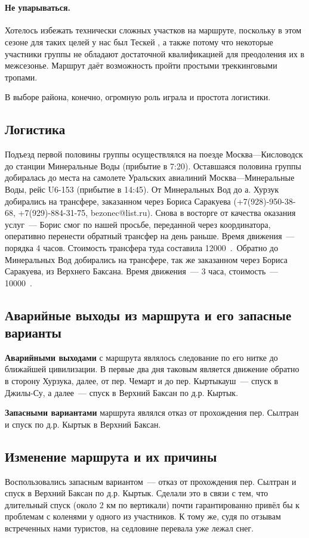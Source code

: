 ﻿﻿\paragraph{﻿﻿Не упарываться.} Хотелось избежать технически сложных участков на маршруте, поскольку в этом сезоне для таких целей у нас был Тескей \cite{teskei2025ostapiv}, а также потому что некоторые участники группы не обладают достаточной квалификацией для преодоления их в межсезонье. Маршрут даёт возможность пройти простыми треккинговыми тропами.

В выборе района, конечно, огромную роль играла и простота логистики.

\subsection{Логистика}
Подъезд первой половины группы осуществлялся на поезде Москва---Кисловодск до станции Минеральные Воды (прибытие в 7:20). Оставшаяся половина группы добиралась до места на самолете Уральских авиалиний Москва---Минеральные Воды, рейс U6-153 (прибытие в 14:45). От Минеральных Вод до а. Хурзук добирались на трансфере, заказанном через Бориса Саракуева (+7(928)-950-38-68, +7(929)-884-31-75, bezonec@list.ru). Снова в восторге от качества оказания услуг~--- Борис смог по нашей просьбе, переданной через координатора, оперативно перенести обратный трансфер на день раньше. Время движения~--- порядка 4 часов. Стоимость трансфера туда составила 12000~\faRub.~Обратно до Минеральных Вод добирались на трансфере, так же заказанном через Бориса Саракуева, из Верхнего Баксана. Время движения~--- 3 часа, стоимость~--- 10000~\faRub.

\subsection{Аварийные выходы из маршрута и его запасные варианты}
\textbf{Аварийными выходами} с маршрута являлось следование по его нитке до ближайшей цивилизации. В первые два дня таковым является движение обратно в сторону Хурзука, далее, от пер. Чемарт и до пер. Кыртыкауш~--- спуск в Джилы-Су, а далее~--- спуск в Верхний Баксан по д.р. Кыртык.


\textbf{Запасными вариантами} маршрута являлся отказ от прохождения пер. Сылтран и спуск по д.р. Кыртык в Верхний Баксан.


\subsection{Изменение маршрута и их причины}
Воспользовались запасным вариантом~--- отказ от прохождения пер. Сылтран и спуск в Верхний Баксан по д.р. Кыртык. Сделали это в связи с тем, что длительный спуск (около 2 км по вертикали) почти гарантированно привёл бы к проблемам с коленями у одного из участников. К тому же, судя по отзывам встреченных нами туристов, на седловине перевала уже лежал снег.

